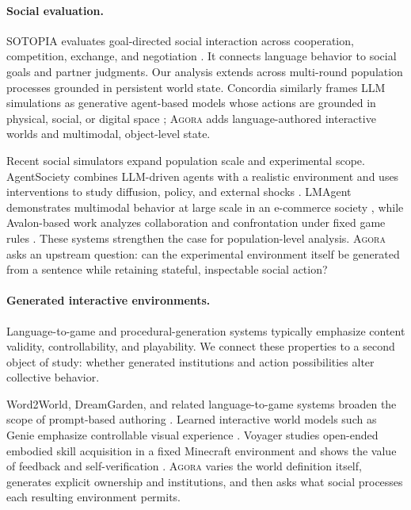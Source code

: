 \documentclass[10pt,twocolumn]{article}
\newcommand{\agora}{\textsc{Agora}\xspace}
\begin{document}
\paragraph{Social evaluation.}
SOTOPIA evaluates goal-directed social interaction across cooperation,
competition, exchange, and negotiation \cite{zhou2024}. It connects language
behavior to social goals and partner judgments. Our analysis extends across
multi-round population processes grounded in persistent world state. Concordia similarly frames LLM simulations as
generative agent-based models whose actions are grounded in physical, social,
or digital space \cite{vezhnevets2023}; \agora adds language-authored interactive
worlds and multimodal, object-level state.

Recent social simulators expand population scale and experimental scope.
AgentSociety combines LLM-driven agents with a realistic environment and uses
interventions to study diffusion, policy, and external shocks
\cite{agentsociety}. LMAgent demonstrates multimodal behavior at large scale in
an e-commerce society \cite{lmagent}, while Avalon-based work analyzes
collaboration and confrontation under fixed game rules \cite{avalon}. These
systems strengthen the case for population-level analysis. \agora asks an
upstream question: can the experimental environment itself be generated from a
sentence while retaining stateful, inspectable social action?

\paragraph{Generated interactive environments.}
Language-to-game and procedural-generation systems typically emphasize content
validity, controllability, and playability. We connect these properties to a
second object of study: whether generated institutions and action possibilities
alter collective behavior.

Word2World, DreamGarden, and related language-to-game systems broaden the scope
of prompt-based authoring \cite{word2world,dreamgarden}. Learned interactive
world models such as Genie emphasize controllable visual experience
\cite{genie}. Voyager studies open-ended embodied skill acquisition in a fixed
Minecraft environment and shows the value of feedback and self-verification
\cite{voyager}. \agora varies the world definition itself, generates explicit
ownership and institutions, and then asks what social processes each resulting
environment permits.
\end{document}
